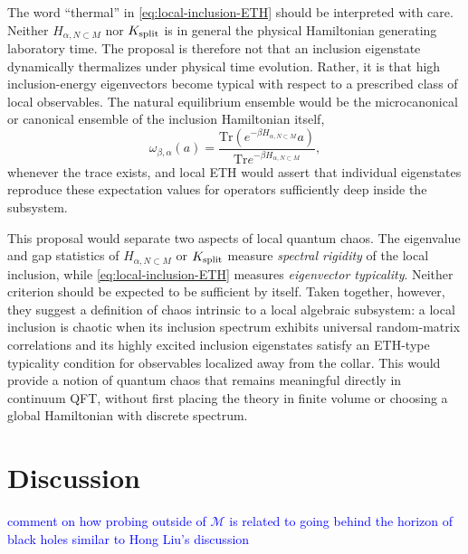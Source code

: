 \documentclass[a4paper,11pt]{article}
\theoremstyle{definition}
\newcommand{\Tr}{\text{Tr}}
\newcommand{\mM}{\mathcal{M}}
\newcommand{\NL}[1]{\textcolor{blue}{#1}}
\begin{document}
The word ``thermal'' in \eqref{eq:local-inclusion-ETH} should be interpreted with care.  Neither $H_{\alpha,N\subset M}$ nor $K_{\rm split}$ is in general the physical Hamiltonian generating laboratory time.  The proposal is therefore not that an inclusion eigenstate dynamically thermalizes under physical time evolution.  Rather, it is that high inclusion-energy eigenvectors become typical with respect to a prescribed class of local observables.  The natural equilibrium ensemble would be the microcanonical or canonical ensemble of the inclusion Hamiltonian itself,
\begin{equation}
    \omega_{\beta,\alpha}(a)
    =
    \frac{
    \Tr\!\left(e^{-\beta H_{\alpha,N\subset M}}a\right)
    }{
    \Tr e^{-\beta H_{\alpha,N\subset M}}
    },
    \label{eq:local-inclusion-canonical}
\end{equation}
whenever the trace exists, and local ETH would assert that individual eigenstates reproduce these expectation values for operators sufficiently deep inside the subsystem.

This proposal would separate two aspects of local quantum chaos.  The eigenvalue and gap statistics of $H_{\alpha,N\subset M}$ or $K_{\rm split}$ measure \emph{spectral rigidity} of the local inclusion, while \eqref{eq:local-inclusion-ETH} measures \emph{eigenvector typicality}.  Neither criterion should be expected to be sufficient by itself.  Taken together, however, they suggest a definition of chaos intrinsic to a local algebraic subsystem: a local inclusion is chaotic when its inclusion spectrum exhibits universal random-matrix correlations and its highly excited inclusion eigenstates satisfy an ETH-type typicality condition for observables localized away from the collar.  This would provide a notion of quantum chaos that remains meaningful directly in continuum QFT, without first placing the theory in finite volume or choosing a global Hamiltonian with discrete spectrum.

\section{Discussion}\label{sec:discussion}

\NL{comment on how probing outside of $\mM$ is related to going behind the horizon of black holes similar to Hong Liu's discussion}
\end{document}
